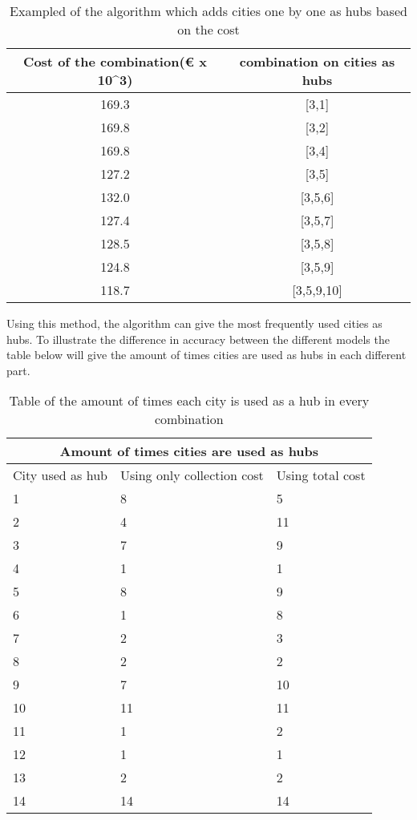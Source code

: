 \documentclass{article}
\begin{document}
\begin{table}[h!]
\begin{center}
 \begin{tabular}{||c |c||} 
 \hline
 Cost of the combination(€ x 10^3) & combination on cities as hubs \\ [0.5ex] 
 \hline\hline
 169.3 & [3,1]  \\ 
 \hline
 169.8 & [3,2]  \\
 \hline
 169.8 & [3,4]  \\
 \hline
 127.2 & [3,5]  \\ 
 \hline
 132.0 & [3,5,6]  \\
  \hline
 127.4 & [3,5,7]  \\
 \hline
 128.5 & [3,5,8]  \\
 \hline
 124.8 & [3,5,9]  \\
  \hline
 118.7 & [3,5,9,10]  \\
 [1ex] 
 \hline
\end{tabular}
\end{center}
\caption{Exampled of the algorithm which adds cities one by one as hubs based on the cost}
\label{Collection Algorithm}
\end{table}

Using this method, the algorithm can give the most frequently used cities as hubs. To illustrate the difference in accuracy between the different models the table below will give the amount of times cities are used as hubs in each different part.%

\begin{table}
\begin{tabular}{|p{3cm}|p{3cm}|p{3cm}|}
\hline
\multicolumn{3}{|c|}{Amount of times cities are used as hubs} \\
\hline
City used as hub & Using only collection cost & Using total cost\\
\hline
1 &  8 & 5 \\
\hline
2 & 4   & 11 \\
\hline
3& 7 & 9\\
\hline
4    & 1 & 1 \\
\hline
5 & 8 & 9\\
\hline
6 & 1 & 8   \\
\hline
7 & 2& 3 \\

\hline
8 & 2 & 2 \\
\hline
9 &  7& 10 \\
\hline
10 & 11 & 11 \\
\hline
11 & 1& 2 \\
\hline
12 & 1 & 1 \\
\hline
13 & 2& 2 \\
\hline
14 & 14& 14 \\
\hline
\end{tabular}
\caption{Table of the amount of times each city is used as a hub in every combination}
\label{amount of times hubs are used in collection} 
\end{table}
\end{document}
